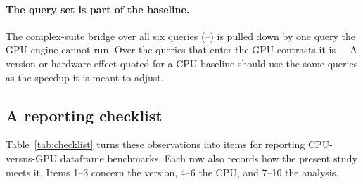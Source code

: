 \documentclass[11pt]{article}
\begin{document}
\paragraph{The query set is part of the baseline.} The complex-suite bridge
over all six queries (--)
is pulled down by one query the GPU engine cannot run. Over the queries that
enter the GPU contrasts it is --.
A version or hardware effect quoted for a CPU baseline should use the same
queries as the speedup it is meant to adjust.

\subsection{A reporting checklist}
\label{sec:checklist}

Table~\ref{tab:checklist} turns these observations into items for reporting
CPU-versus-GPU dataframe benchmarks. Each row also records how the present
study meets it. Items 1--3 concern the version, 4--6 the CPU, and 7--10 the
analysis.
\end{document}
